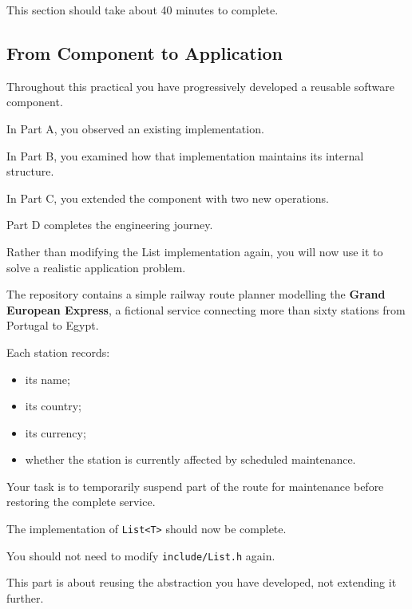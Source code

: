 \documentclass{csc2059practical}
\begin{document}
\begin{infobox}
This section should take about 40 minutes to complete.
\end{infobox}


\subsection{From Component to Application}

Throughout this practical you have progressively developed a reusable software component.

In Part A, you observed an existing implementation.

In Part B, you examined how that implementation maintains its internal structure.

In Part C, you extended the component with two new operations.

Part D completes the engineering journey.

Rather than modifying the List implementation again, you will now use it to solve a realistic application problem.

The repository contains a simple railway route planner modelling the \textbf{Grand European Express}, a fictional service connecting more than sixty stations from Portugal to Egypt.

Each station records:

\begin{itemize}
    \item its name;
    \item its country;
    \item its currency;
    \item whether the station is currently affected by scheduled maintenance.
\end{itemize}

Your task is to temporarily suspend part of the route for maintenance before restoring the complete service.


\begin{importantnote}
The implementation of \texttt{List<T>} should now be complete.

You should not need to modify \texttt{include/List.h} again.

This part is about reusing the abstraction you have developed, not extending it further.
\end{importantnote}


\end{document}
